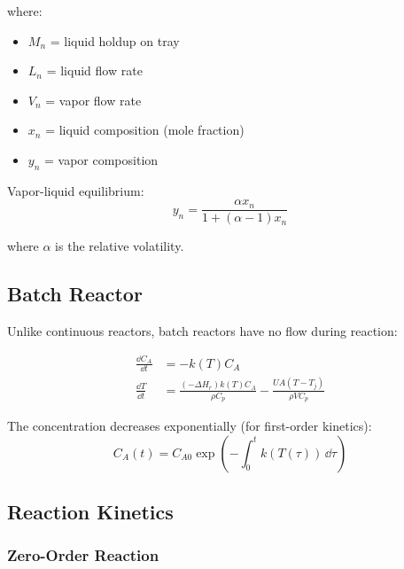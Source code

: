 where:
\begin{itemize}
    \item $M_n$ = liquid holdup on tray
    \item $L_n$ = liquid flow rate
    \item $V_n$ = vapor flow rate
    \item $x_n$ = liquid composition (mole fraction)
    \item $y_n$ = vapor composition
\end{itemize}

Vapor-liquid equilibrium:
\begin{equation}
y_n = \frac{\alpha x_n}{1 + (\alpha - 1)x_n}
\end{equation}

where $\alpha$ is the relative volatility.

\subsection{Batch Reactor}
\label{subsec:batch}

Unlike continuous reactors, batch reactors have no flow during reaction:

\begin{align}
\frac{\dd C_A}{\dd t} &= -k(T)C_A \\
\frac{\dd T}{\dd t} &= \frac{(-\Delta H_r)k(T)C_A}{\rho C_p} - \frac{UA(T - T_j)}{\rho V C_p}
\end{align}

The concentration decreases exponentially (for first-order kinetics):
\begin{equation}
C_A(t) = C_{A0}\exp\left(-\int_0^t k(T(\tau))\,\dd\tau\right)
\end{equation}

\subsection{Reaction Kinetics}
\label{subsec:kinetics}

\subsubsection{Zero-Order Reaction}

